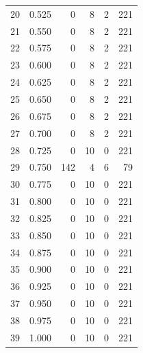 \documentclass[a4paper,twoside,12pt]{book}
\begin{document}
\begin{appendices}
\begin{table}
\begin{tabular}{lrrrrr}
		20 &  0.525 &         0 &         8 &               2 &             221 \\
		21 &  0.550 &         0 &         8 &               2 &             221 \\
		22 &  0.575 &         0 &         8 &               2 &             221 \\
		23 &  0.600 &         0 &         8 &               2 &             221 \\
		24 &  0.625 &         0 &         8 &               2 &             221 \\
		25 &  0.650 &         0 &         8 &               2 &             221 \\
		26 &  0.675 &         0 &         8 &               2 &             221 \\
		27 &  0.700 &         0 &         8 &               2 &             221 \\
		28 &  0.725 &         0 &        10 &               0 &             221 \\
		29 &  0.750 &       142 &         4 &               6 &              79 \\
		30 &  0.775 &         0 &        10 &               0 &             221 \\
		31 &  0.800 &         0 &        10 &               0 &             221 \\
		32 &  0.825 &         0 &        10 &               0 &             221 \\
		33 &  0.850 &         0 &        10 &               0 &             221 \\
		34 &  0.875 &         0 &        10 &               0 &             221 \\
		35 &  0.900 &         0 &        10 &               0 &             221 \\
		36 &  0.925 &         0 &        10 &               0 &             221 \\
		37 &  0.950 &         0 &        10 &               0 &             221 \\
		38 &  0.975 &         0 &        10 &               0 &             221 \\
		39 &  1.000 &         0 &        10 &               0 &             221 \\
		\bottomrule
	\end{tabular}
\end{table}
	

\end{appendices}
\end{document}
